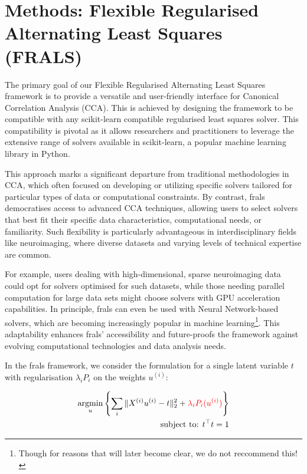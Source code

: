\section{Methods: Flexible Regularised Alternating Least Squares (FRALS)}\label{subsec:flexible-regularised-alternating-least-squares-(frals)}

The primary goal of our Flexible Regularised Alternating Least Squares framework is to provide a versatile and user-friendly interface for Canonical Correlation Analysis (CCA). This is achieved by designing the framework to be compatible with any scikit-learn compatible regularised least squares solver.
This compatibility is pivotal as it allows researchers and practitioners to leverage the extensive range of solvers available in scikit-learn, a popular machine learning library in Python.

This approach marks a significant departure from traditional methodologies in CCA, which often focused on developing or utilizing specific solvers tailored for particular types of data or computational constraints.
By contrast, \acrshort{frals} democratises access to advanced CCA techniques, allowing users to select solvers that best fit their specific data characteristics, computational needs, or familiarity.
Such flexibility is particularly advantageous in interdisciplinary fields like neuroimaging, where diverse datasets and varying levels of technical expertise are common.

For example, users dealing with high-dimensional, sparse neuroimaging data could opt for solvers optimised for such datasets, while those needing parallel computation for large data sets might choose solvers with GPU acceleration capabilities.
In principle, \acrshort{frals} can even be used with Neural Network-based solvers, which are becoming increasingly popular in machine learning\footnote{Though for reasons that will later become clear, we do not reccommend this!}.
This adaptability enhances \acrshort{frals}' accessibility and future-proofs the framework against evolving computational technologies and data analysis needs.

In the \acrshort{frals} framework, we consider the formulation for a single latent variable \(t\) with regularisation \(\lambda_i P_i\) on the weights \(u^{(i)}\):

\begin{align}
    \underset{u}{\mathrm{argmin}}\left\{\sum_i \|X^{(i)} u^{(i)} - t\|_2^2 + \textcolor{red}{\lambda_i P_i(u^{(i)})} \right\}\\
    \text{subject to: }t^\top t = 1 \notag
\end{align}

